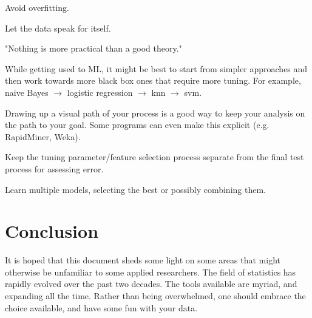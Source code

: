 \documentclass[english,nohyper,titlepage]{tufte-handout}\usepackage{knitr}
\begin{document}
\smallskip
\noindent Avoid overfitting.

\smallskip
\noindent Let the data speak for itself. 

\smallskip
\noindent "Nothing is more practical than a good theory."

\smallskip
\noindent While getting used to ML, it might be best to start from simpler approaches and then work towards more black box ones that require more tuning. For example, naive Bayes $\rightarrow$ logistic regression $\rightarrow$ knn $\rightarrow$ svm.

\smallskip
\noindent Drawing up a visual path of your process is a good way to keep your analysis on the path to your goal.  Some programs can even make this explicit (e.g. RapidMiner, Weka).

\smallskip
\noindent Keep the tuning parameter/feature selection process separate from the final test process for assessing error.

\smallskip
\noindent Learn multiple models, selecting the best or possibly combining them.

\section{Conclusion}
It is hoped that this document sheds some light on some areas that might otherwise be unfamiliar to some applied researchers. The field of statistics has rapidly evolved over the past two decades.  The tools available are myriad, and expanding all the time.  Rather than being overwhelmed, one should embrace the choice available, and have some fun with your data.






\pagebreak

\end{document}
